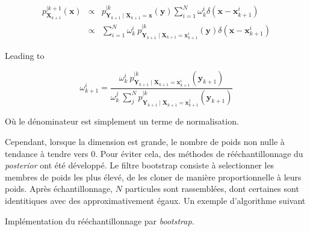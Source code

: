 \begin{eqnarray*}
    p_{\bm X_{k+1}}^{\mid k+1}(\bm x) &\propto& p_{\bm Y_{k+1} \mid \bm X_{k+1} = \bm x}^{\mid k}(\bm y)  \sum_{i=1}^N \omega^i_k \delta(\bm x - \bm x_{k+1}^i) \\
    &\propto& \sum_{i=1}^N  \omega^i_k~p_{\bm Y_{k+1} \mid \bm X_{k+1} = \bm x_{k+1}^i}^{\mid k}(\bm y)\delta(\bm x - \bm x_{k+1}^i)
\end{eqnarray*}

Leading to

\begin{equation*}
    \omega^i_{k+1}  = \frac{\omega^i_k~p_{\bm Y_{k+1} \mid \bm X_{k+1} = \bm x_{k+1}^i}^{\mid k}(\bm y_{k+1}) }{\omega^j_k~\sum_j^N p_{\bm Y_{k+1} \mid \bm X_{k+1} = \bm x_{k+1}^j}^{\mid k}(\bm y_{k+1}) }
\end{equation*}

Où le dénominateur est simplement un terme de normalisation.

Cependant, lorsque la dimension est grande, le nombre de poids non nulle à tendance à tendre vers 0. Pour éviter cela, des méthodes de rééchantillonnage du \textit{posterior} ont été développé. Le filtre bootstrap \cite{gordon_1993} consiste à selectionner les membres de poids les plus élevé, de les cloner de manière proportionnelle à leurs poids. Après échantillonnage, $N$ particules sont rassemblées, dont certaines sont identitiques avec des approximativement égaux.
Un exemple d'algorithme suivant

\begin{algorithm}
    \caption{Implémentation du rééchantillonnage par \textit{bootstrap}.}
    \Pour{membre $n$ do}{
    Tirer $u$ dans $\mathcal{U}[0,1[$\;
    Initialiser $j=1$\;
    Affecter $S_w = w^1$\;
    \Tq{$S_w < u$}{
        $j = j+1$\;
        $S_w = S_w + w(j)\;$
    }
    Le membre $j$  est conservé et remplace le membre $n$.
    }
\end{algorithm}

